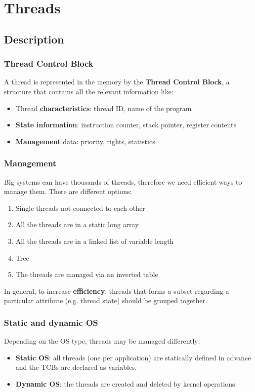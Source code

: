 \newpage
\section{Threads}
\subsection{Description}
\subsubsection{Thread Control Block}
A thread is represented in the memory by the \textbf{Thread Control Block}, a structure that contains all the relevant information like:
\begin{itemize}
	\item Thread \textbf{characteristics}: thread ID, name of the program
	\item \textbf{State information}: instruction counter, stack pointer, register contents
	\item \textbf{Management} data: priority, rights, statistics
\end{itemize}
\subsubsection{Management}
Big systems can have thousands of threads, therefore we need efficient ways to manage them. There are different options:
\begin{enumerate}
	\item Single threads not connected to each other
	\item All the threads are in a static long array
	\item All the threads are in a linked list of  variable length
	\item Tree
	\item The threads are managed via an inverted table
\end{enumerate}
In general, to increase \textbf{efficiency}, threads that forms a subset regarding a particular attribute (e.g. thread state) should be grouped together.
\subsubsection{Static and dynamic OS}
Depending on the OS type, threads may be managed differently:
\begin{itemize}
	\item \textbf{Static OS}: all threads (one per application) are statically defined in advance and the TCBs are declared as variables.
	\item \textbf{Dynamic OS}: the threads are created and deleted by kernel operations
\end{itemize}

